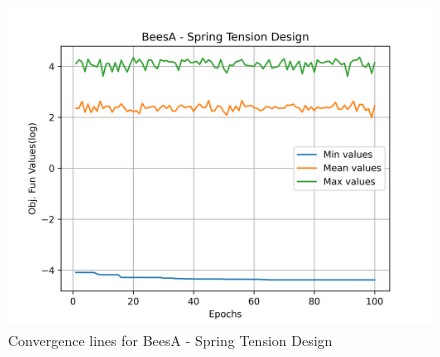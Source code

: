 \begin{figure}[H]
        \centering
        \caption{Convergence lines for BeesA - Spring Tension Design}
        \label{fig:spring_problem_solve_beesa}
        \includegraphics[scale=0.5]{images/spring_problem_solve_beesa.png}
        \end{figure}
        